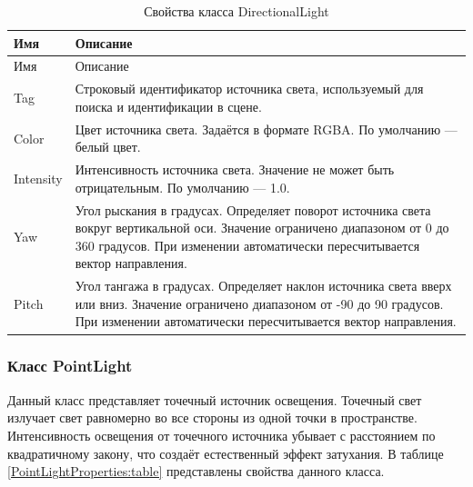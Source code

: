 \begin{xltabular}{\textwidth}{|>{\raggedright\arraybackslash}p{5cm}|>{\raggedright\arraybackslash}X|}
	\caption{Свойства класса DirectionalLight\label{DirectionalLightProperties:table}}\\ \hline
	\centrow Имя & \centrow Описание \\ \hline
	\endfirsthead
	\centrow Имя & \centrow Описание \\ \hline 
	\finishhead
	Tag & Строковый идентификатор источника света, используемый для поиска и идентификации в сцене. \\
	\hline
	Color & Цвет источника света. Задаётся в формате RGBA. По умолчанию — белый цвет. \\
	\hline
	Intensity & Интенсивность источника света. Значение не может быть отрицательным. По умолчанию — 1.0. \\
	\hline
	Yaw & Угол рыскания в градусах. Определяет поворот источника света вокруг вертикальной оси. Значение ограничено диапазоном от 0 до 360 градусов. При изменении автоматически пересчитывается вектор направления. \\
	\hline
	Pitch & Угол тангажа в градусах. Определяет наклон источника света вверх или вниз. Значение ограничено диапазоном от -90 до 90 градусов. При изменении автоматически пересчитывается вектор направления.
\end{xltabular}

\subsubsection{Класс PointLight}
Данный класс представляет точечный источник освещения. Точечный свет излучает свет равномерно во все стороны из одной точки в пространстве. Интенсивность освещения от точечного источника убывает с расстоянием по квадратичному закону, что создаёт естественный эффект затухания. В таблице \ref{PointLightProperties:table} представлены свойства данного класса.

